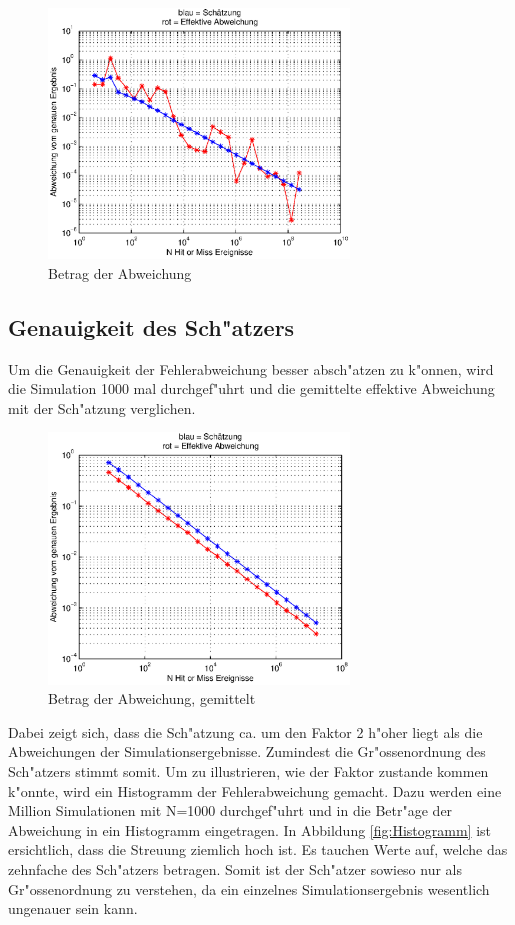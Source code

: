 \begin{refsection}
\begin{figure}[ht!]
    \centering
    \includegraphics[width=8cm]{montecarlo/images/Fehler.eps}
    \caption{Betrag der Abweichung}
    \label{fig:Fehler}
\end{figure}
\newpage

\subsection{Genauigkeit des Sch"atzers}

Um die Genauigkeit der Fehlerabweichung besser absch"atzen zu k"onnen,
wird die Simulation 1000 mal durchgef"uhrt und die gemittelte effektive
Abweichung mit der Sch"atzung verglichen.

\begin{figure}[ht!]
    \centering
    \includegraphics[width=8cm]{montecarlo/images/Fehler_gemittelt.eps}
    \caption{Betrag der Abweichung, gemittelt}
    \label{fig:Fehler_gemittelt}
\end{figure}

Dabei zeigt sich, dass die Sch"atzung ca. um den Faktor 2 h"oher liegt als
die Abweichungen der Simulationsergebnisse. Zumindest die Gr"ossenordnung
des Sch"atzers stimmt somit. Um zu illustrieren, wie der Faktor zustande
kommen k"onnte, wird ein Histogramm der Fehlerabweichung gemacht. Dazu
werden eine Million Simulationen mit N=1000 durchgef"uhrt und in die
Betr"age der Abweichung in ein Histogramm eingetragen. In Abbildung
\ref{fig:Histogramm} ist ersichtlich, dass die Streuung ziemlich
hoch ist. Es tauchen Werte auf, welche das zehnfache des Sch"atzers
betragen. Somit ist der Sch"atzer sowieso nur als Gr"ossenordnung zu
verstehen, da ein einzelnes Simulationsergebnis wesentlich ungenauer
sein kann.


\end{refsection}
